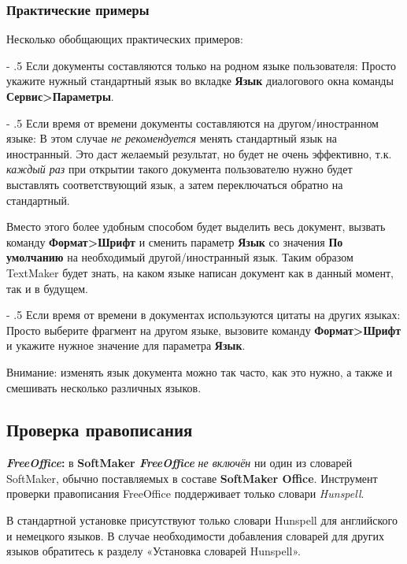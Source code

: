 ﻿\documentclass[a4paper,10pt]{article}
\makeatletter
\renewcommand\paragraph{%
   \@startsection{paragraph}{4}{0mm}%
      {-\baselineskip}%
      {.5\baselineskip}%
      {\normalfont\normalsize\bfseries}}
\makeatother
\begin{document}
\subsubsection{Практические примеры}
Несколько обобщающих практических примеров:

\paragraph{Если документы составляются только на родном языке пользователя:}
Просто укажите нужный стандартный язык во вкладке \textbf{Язык} диалогового окна команды \textbf{Сервис>Параметры}.

\paragraph{Если время от времени документы составляются на другом/иностранном языке:}
В этом случае \textit{не рекомендуется} менять стандартный язык на иностранный. Это даст желаемый результат, но будет не очень эффективно, т.к. \textit{каждый раз} при открытии такого документа пользователю нужно будет выставлять соответствующий язык, а затем переключаться обратно на стандартный.

Вместо этого более удобным способом будет выделить весь документ, вызвать команду \textbf{Формат>Шрифт} и сменить параметр \textbf{Язык} со значения \textbf{По умолчанию} на необходимый другой/иностранный язык. Таким образом TextMaker будет знать, на каком языке написан документ как в данный момент, так и в будущем.

\paragraph{Если время от времени в документах используются цитаты на других языках:}
Просто выберите фрагмент на другом языке, вызовите команду \textbf{Формат>Шрифт} и укажите нужное значение для параметра \textbf{Язык}.

Внимание: изменять язык документа можно так часто, как это нужно, а также и смешивать несколько различных языков.

\subsection{Проверка правописания}
\begin{mdframed}[backgroundcolor=pink!50]
\textbf{\textit{FreeOffice}:} в \textbf{SoftMaker \textit{FreeOffice}} \textit{не включён} ни один из словарей SoftMaker, обычно поставляемых в составе \textbf{SoftMaker Office}. Инструмент проверки правописания FreeOffice поддерживает только словари \textit{Hunspell}.

В стандартной установке присутствуют только словари Hunspell для английского и немецкого языков. В случае необходимости добавления словарей для других языков обратитесь к разделу «Установка словарей Hunspell».
\end{mdframed}
\end{document}
